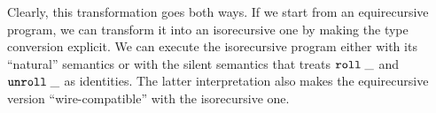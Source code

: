 Clearly, this transformation goes both ways. If we start from an
equirecursive program, we can transform it into an isorecursive one by
making the type conversion explicit. We can execute the isorecursive
program either with its ``natural'' semantics or with the silent
semantics that treats $\mathtt{roll}\; \_$ and $\mathtt{unroll}\; \_$ as identities.
The latter interpretation also makes the equirecursive version
``wire-compatible'' with the isorecursive one.


  

